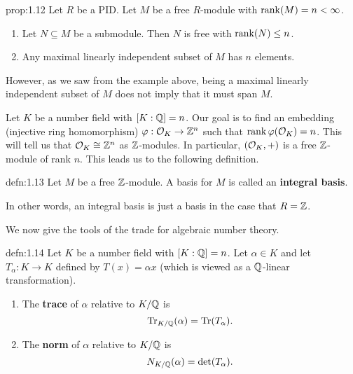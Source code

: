 \begin{prop}{prop:1.12}
    Let $R$ be a PID. Let $M$ be a free $R$-module with $\operatorname{rank}(M) = n < \infty$. 
    \begin{enumerate}[(1)]
        \item Let $N \subseteq M$ be a submodule. Then $N$ is free with $\operatorname{rank}(N) \leq n$. 
        \item Any maximal linearly independent subset of $M$ has $n$ elements. 
    \end{enumerate}
\end{prop}

However, as we saw from the example above, being a maximal linearly 
independent subset of $M$ does not imply that it must span $M$.

Let $K$ be a number field with $[K : \mathbb{Q}] = n$. Our goal is to find 
an embedding (injective ring homomorphism) $\varphi : {\cal O}_K \to \mathbb{Z}^n$ 
such that $\operatorname{rank} \varphi({\cal O}_K) = n$. This will tell us that 
${\cal O}_K \cong \mathbb{Z}^n$ as $\mathbb{Z}$-modules. In particular, $({\cal O}_K, +)$ 
is a free $\mathbb{Z}$-module of rank $n$. This leads us to the following definition. 

\begin{defn}{defn:1.13}
    Let $M$ be a free $\mathbb{Z}$-module. A basis for $M$ is called an 
    {\bf integral basis}.
\end{defn}

In other words, an integral basis is just a basis in the case that $R = \mathbb{Z}$.

We now give the tools of the trade for algebraic number theory. 

\begin{defn}{defn:1.14}
    Let $K$ be a number field with $[K : \mathbb{Q}] = n$. Let 
    $\alpha \in K$ and let $T_\alpha : K \to K$ defined by 
    $T(x) = \alpha x$ (which is viewed as a $\mathbb{Q}$-linear transformation).
    \begin{enumerate}[(1)]
        \item The {\bf trace} of $\alpha$ relative to $K/\mathbb{Q}$ is 
        \[ \operatorname{Tr}_{K/\mathbb{Q}}(\alpha) = \operatorname{Tr}(T_\alpha). \] 
        \item The {\bf norm} of $\alpha$ relative to $K/\mathbb{Q}$ is 
        \[ N_{K/\mathbb{Q}}(\alpha) = \det(T_\alpha). \] 
    \end{enumerate}
\end{defn}